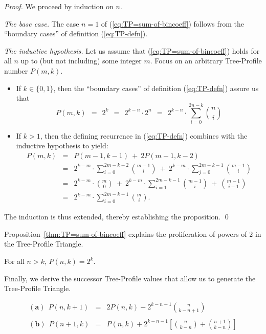\begin{proof}
We proceed by induction on $n$.

\medskip

\noindent
{\it The base case.}
The case $n=1$ of (\ref{eq:TP=sum-of-bincoeff}) follows from the
``boundary cases'' of definition (\ref{eq:TP-defn}).

\medskip

\noindent
{\it The inductive hypothesis.}
Let us assume that (\ref{eq:TP=sum-of-bincoeff}) holds for all $n$ up
to (but not including) some integer $m$.  Focus on an arbitrary
Tree-Profile number $P(m,k)$.
\begin{itemize}
\item
If $k \in \{0,1\}$, then the ``boundary cases'' of definition
(\ref{eq:TP-defn}) assure us that
\[
P(m,k) \ \ = \ \ 2^k \ \ = \ \ 2^{k-n} \cdot 2^n \ \ = \ \ 
2^{k-n} \cdot \sum_{i=0}^{2n-k} {n \choose i}
\]

\item
If $k > 1$, then the defining recurrence in (\ref{eq:TP-defn})
combines with the inductive hypothesis to yield:
\begin{eqnarray*}
\nonumber
P(m, k) & = &
   P(m-1, k-1) \ + \ 2 P(m-1, k-2) \\
        & = &
   2^{k-m} \cdot \sum_{i=0}^{2m-k-2} {m-1 \choose i}
   \ + \
   2^{k-m} \cdot \sum_{j=0}^{2m-k-1} {m-1 \choose i} \\
        & = &
   2^{k-m} \cdot {m \choose 0}
   \ + \
   2^{k-m} \cdot \sum_{i=1}^{2m-k-1} {m-1 \choose i}
   \ + \
   {{m-1} \choose {i-1}} \\
        & = &
   2^{k-m} \cdot \sum_{i=0}^{2m-k-1} {m \choose i}.
\end{eqnarray*}
\end{itemize}
The induction is thus extended, thereby establishing the proposition.
\qed
\end{proof}

Proposition~\ref{thm:TP=sum-of-bincoeff} explains the proliferation of
powers of $2$ in the Tree-Profile Triangle.

\begin{corol}
For all $n > k$, $P(n,k) = 2^k$.
\end{corol}

\medskip

Finally, we derive the successor Tree-Profile values that allow us to
generate the Tree-Profile Triangle.

\begin{prop}
\label{thm:successor-TP-values}
\begin{eqnarray*}
\nonumber
\mathbf{(a)} \ \
P(n, k+1) & = & 
  2 P(n,k) - 2^{k-n+1} {n \choose {k-n+1}} \\
\label{eq:successor-TP-values}
          &   & \\
\nonumber
\mathbf{(b)} \ \
P(n+1, k) & = &
  P(n,k) + 2^{k-n-1} \left[ {n \choose {k-n}} + {{n+1} \choose {k-n}} \right]
\end{eqnarray*}
\end{prop}

